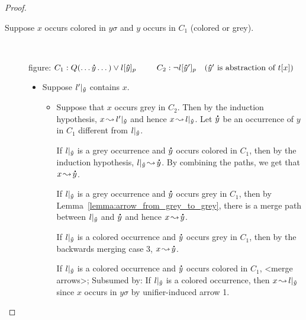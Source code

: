 \documentclass[,%
	paper=a4,%
	DIV10, %
	twoside=false,%
	liststotoc,
	bibtotoc,
	draft=false,%
	numbers=noendperiod
]{scrartcl}
\begin{document}
\begin{proof}
\begin{description}
\begin{itemize}
\begin{itemize}
\begin{itemize}
							\end{itemize}

					\end{itemize}



			\end{itemize}

		\item[Suppose $x$ occurs colored in $y\sigma$ and $y$ occurs in $C_1$ (colored or grey).]
			~

			figure:
			$C_1: Q(\dots \bdot y \dots) \lor l\occat{\bhat y}{p}\quad\quad$
			$C_2: \lnot l{[\bm\hat y']_{p}}\quad(\bm\hat y' \text{ is abstraction of } t[x])$


			\begin{itemize}
				\item Suppose $l'|_{\bm\hat y}$ contains $x$.
					\begin{itemize}
							\item
					Suppose that  $x$ occurs grey in $C_2$. Then by the induction hypothesis,
					$x\operatorname{\leadsto} l'|_{\bm\hat y}$ and hence 
					$x\operatorname{\leadsto} l|_{\bm\hat y}$. Let $\bm\dot y$ be an occurrence of $y$ in $C_1$ different from $l|_{\bm\hat y}$.

					If $l|_{\bm\hat y}$ is a grey occurrence and $\bm\dot y$ occurs colored in $C_1$, then by the induction hypothesis, $l|_{\bm\hat y} \operatorname{\leadsto} \bm\dot y$. By combining the paths, we get that $x\operatorname{\leadsto} \bm\dot y$.

					If $l|_{\bm\hat y}$ is a grey occurrence and $\bm\dot y$ occurs grey in $C_1$, then by Lemma~\ref{lemma:arrow_from_grey_to_grey}, there is a merge path between $l|_{\bm\hat y}$ and $\bm\dot y$ and hence $x\operatorname{\leadsto} \bm\dot y$.


					If $l|_{\bm\hat y}$ is a colored occurrence and $\bm\dot y$ occurs grey in $C_1$, then by the backwards merging case 3, $x\operatorname{\leadsto} \bm\dot y$.

					If $l|_{\bm\hat y}$ is a colored occurrence and $\bm\dot y$ occurs colored in $C_1$, <merge arrows>;
					Subsumed by:
					If $l|_{\bm\hat y}$ is a colored occurrence, then $x\operatorname{\leadsto} l|_{\bm\hat y}$ since $x$ occurs in $y\sigma$ by unifier-induced arrow 1.



\end{itemize}
\end{itemize}
\end{description}
\end{proof}
\end{document}

